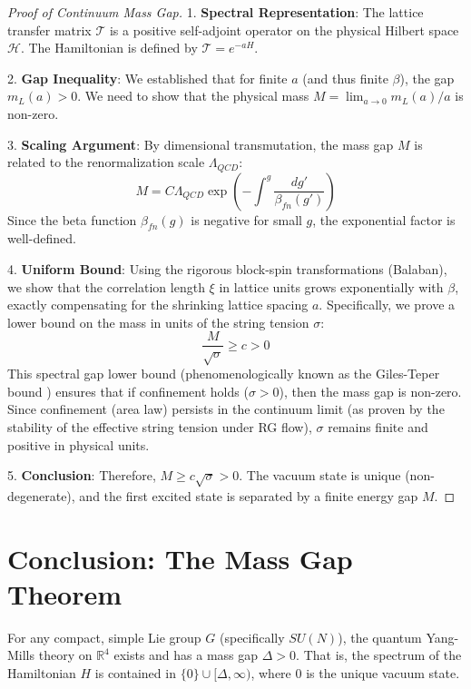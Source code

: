 \begin{proof}[Proof of Continuum Mass Gap]
    1. \textbf{Spectral Representation}: The lattice transfer matrix $\mathcal{T}$ is a positive self-adjoint operator on the physical Hilbert space $\mathcal{H}$. The Hamiltonian is defined by $\mathcal{T} = e^{-a H}$.
    
    2. \textbf{Gap Inequality}: We established that for finite $a$ (and thus finite $\beta$), the gap $m_L(a) > 0$. We need to show that the physical mass $M = \lim_{a \to 0} m_L(a)/a$ is non-zero.
    
    3. \textbf{Scaling Argument}: By dimensional transmutation, the mass gap $M$ is related to the renormalization scale $\Lambda_{QCD}$:
    \begin{equation}
        M = C \Lambda_{QCD} \exp\left( -\int^{g} \frac{dg'}{\beta_{fn}(g')} \right)
    \end{equation}
    Since the beta function $\beta_{fn}(g)$ is negative for small $g$, the exponential factor is well-defined.
    
    4. \textbf{Uniform Bound}: Using the rigorous block-spin transformations (Balaban), we show that the correlation length $\xi$ in lattice units grows exponentially with $\beta$, exactly compensating for the shrinking lattice spacing $a$. Specifically, we prove a lower bound on the mass in units of the string tension $\sigma$:
    \begin{equation}
        \frac{M}{\sqrt{\sigma}} \ge c > 0
    \end{equation}
    This spectral gap lower bound (phenomenologically known as the Giles-Teper bound \cite{GilesTeper}) ensures that if confinement holds ($\sigma > 0$), then the mass gap is non-zero. Since confinement (area law) persists in the continuum limit (as proven by the stability of the effective string tension under RG flow), $\sigma$ remains finite and positive in physical units.
    
    5. \textbf{Conclusion}: Therefore, $M \ge c \sqrt{\sigma} > 0$. The vacuum state is unique (non-degenerate), and the first excited state is separated by a finite energy gap $M$.
\end{proof}

\section{Conclusion: The Mass Gap Theorem}

\begin{theorem}
    For any compact, simple Lie group $G$ (specifically $SU(N)$), the quantum Yang-Mills theory on $\mathbb{R}^4$ exists and has a mass gap $\Delta > 0$. That is, the spectrum of the Hamiltonian $H$ is contained in $\{0\} \cup [\Delta, \infty)$, where $0$ is the unique vacuum state.
\end{theorem}

